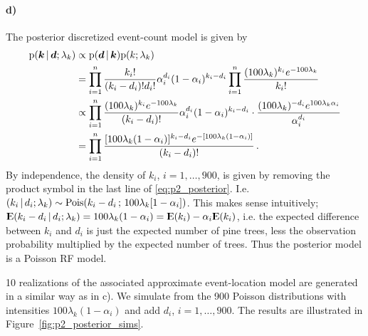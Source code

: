 \paragraph{d)}
The posterior discretized  event-count model is given by
%
\begin{equation}
\label{eq:p2_posterior}
\begin{split}
    \mathrm{p}(\bm{k} \, | \, \bm{d}; \lambda_k) &\propto \mathrm{p}(\bm{d} \, | \, \bm{k}) \mathrm{p}(k; \lambda_k) \\
    &= \prod_{i=1}^n \frac{k_i!}{(k_i - d_i)!d_i!} \alpha_i^{d_i} (1 - \alpha_i)^{k_i - d_i} \prod_{i=1}^n \frac{(100\lambda_k)^{k_i} e^{-100\lambda_k}}{k_i!} \\
    &\propto \prod_{i=1}^n \frac{(100\lambda_k)^{k_i} e^{-100\lambda_k}}{(k_i - d_i)!} \alpha_i^{d_i} (1 - \alpha_i)^{k_i - d_i} \cdot \frac{(100\lambda_k)^{-d_i} e^{100\lambda_k\alpha_i}}{\alpha_i^{d_i}} \\
    &= \prod_{i=1}^n \frac{[100\lambda_k(1-\alpha_i)]^{k_i-d_i} e^{-[100\lambda_k(1-\alpha_i)]}}{(k_i-d_i)!} \, .
\end{split}
\end{equation}
%
By independence, the density of $k_i$, $i = 1, \dots, 900$, is given by removing the product symbol in the last line of \eqref{eq:p2_posterior}. I.e. $(k_i \, | \, d_i; \lambda_k) \sim \mathrm{Pois}(k_i - d_i \,;\, 100\lambda_k[1-\alpha_i])$. This makes sense intuitively; ${\rm I\kern-.3em E}(k_i - d_i \, | \, d_i; \lambda_k) = 100\lambda_k(1-\alpha_i) = {\rm I\kern-.3em E}(k_i) - \alpha_i{\rm I\kern-.3em E}(k_i)$, i.e. the expected difference between $k_i$ and $d_i$ is just the expected number of pine trees, less the observation probability multiplied by the expected number of trees. Thus the posterior model is a Poisson RF model.

10 realizations of the associated approximate event-location model are generated in a similar way as in c). We simulate from the 900 Poisson distributions with intensities $100\lambda_k(1-\alpha_i)$ and add $d_i$, $i = 1, \dots, 900$. The results are illustrated in Figure~\ref{fig:p2_posterior_sims}.

